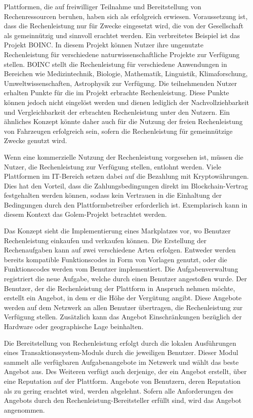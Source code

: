 Plattformen, die auf freiwilliger Teilnahme und Bereitstellung von Rechenressourcen beruhen, haben sich als erfolgreich erwiesen. Voraussetzung ist, dass die Rechenleistung nur für Zwecke eingesetzt wird, die von der Gesellschaft als gemeinnützig und sinnvoll erachtet werden. Ein verbreitetes Beispiel ist das Projekt \gls{BOINC}. In diesem Projekt können Nutzer ihre ungenutzte Rechenleistung für verschiedene naturwissenschaftliche Projekte zur Verfügung stellen. \gls{BOINC} stellt die Rechenleistung für verschiedene Anwendungen in Bereichen wie Medizintechnik, Biologie, Mathematik, Linguistik, Klimaforschung, Umweltwissenschaften, Astrophysik zur Verfügung. Die teilnehmenden Nutzer erhalten Punkte für die im Projekt erbrachte Rechenleistung. Diese Punkte können jedoch nicht eingelöst werden und dienen lediglich der Nachvollziehbarkeit und Vergleichbarkeit der erbrachten Rechenleistung unter den Nutzern. Ein ähnliches Konzept könnte daher auch für die Nutzung der freien Rechenleistung von Fahrzeugen erfolgreich sein, sofern die Rechenleistung für gemeinnützige Zwecke genutzt wird.

Wenn eine kommerzielle Nutzung der Rechenleistung vorgesehen ist, müssen die Nutzer, die Rechenleistung zur Verfügung stellen, entlohnt werden. Viele Plattformen im IT-Bereich setzen dabei auf die Bezahlung mit Kryptowährungen. Dies hat den Vorteil, dass die Zahlungsbedingungen direkt im Blockchain-Vertrag festgehalten werden können, sodass kein Vertrauen in die Einhaltung der Bedingungen durch den Plattformbetreiber erforderlich ist. Exemplarisch kann in diesem Kontext das Golem-Projekt betrachtet werden. 

Das Konzept sieht die Implementierung eines Markplatzes vor, wo Benutzer Rechenleistung einkaufen und verkaufen können. Die Erstellung der Rechenaufgaben kann auf zwei verschiedene Arten erfolgen. Entweder werden bereits kompatible Funktionscodes in Form von Vorlagen genutzt, oder die Funktionscodes werden vom Benutzer implementiert. Die Aufgabenverwaltung registriert die neue Aufgabe, welche durch einen Benutzer angestoßen wurde. Der Benutzer, der die Rechenleistung der Plattform in Anspruch nehmen möchte, erstellt ein Angebot, in dem er die Höhe der Vergütung angibt. Diese Angebote werden auf dem Netzwerk an allen Benutzer übertragen, die Rechenleistung zur Verfügung stellen. Zusätzlich kann das Angebot Einschränkungen bezüglich der Hardware oder geographische Lage beinhalten.

Die Bereitstellung von Rechenleistung erfolgt durch die lokalen Ausführungen eines Transaktionssystem-Moduls durch die jeweiligen Benutzer. Dieser Modul sammelt alle verfügbaren Aufgabenangebote im Netzwerk und wählt das beste Angebot aus. Des Weiteren verfügt auch derjenige, der ein Angebot erstellt, über eine Reputation auf der Plattform. Angebote von Benutzern, deren Reputation als zu gering erachtet wird, werden abgelehnt. Sofern alle Anforderungen des Angebots durch den Rechenleistung-Bereitsteller erfüllt sind, wird das Angebot angenommen. 

